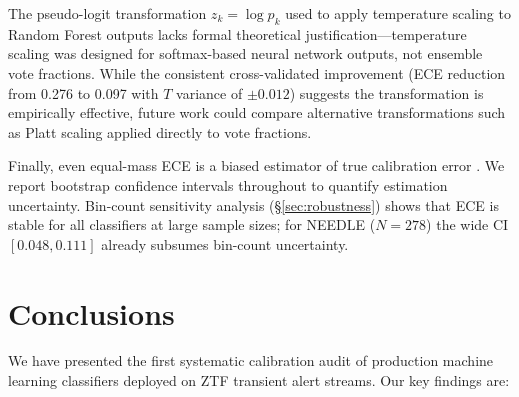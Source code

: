 \documentclass[twocolumn]{aastex631}
\begin{document}
The pseudo-logit transformation $z_k = \log p_k$ used to apply temperature scaling to Random Forest outputs lacks formal theoretical justification---temperature scaling was designed for softmax-based neural network outputs, not ensemble vote fractions. While the consistent cross-validated improvement (ECE reduction from 0.276 to 0.097 with $T$ variance of $\pm 0.012$) suggests the transformation is empirically effective, future work could compare alternative transformations such as Platt scaling applied directly to vote fractions.

Finally, even equal-mass ECE is a biased estimator of true calibration error \citep{roelofs2022}. We report bootstrap confidence intervals throughout to quantify estimation uncertainty. Bin-count sensitivity analysis (\S\ref{sec:robustness}) shows that ECE is stable for all classifiers at large sample sizes; for NEEDLE ($N = 278$) the wide CI $[0.048, 0.111]$ already subsumes bin-count uncertainty.


\section{Conclusions} \label{sec:conclusions}

We have presented the first systematic calibration audit of production machine learning classifiers deployed on ZTF transient alert streams. Our key findings are:
\end{document}
